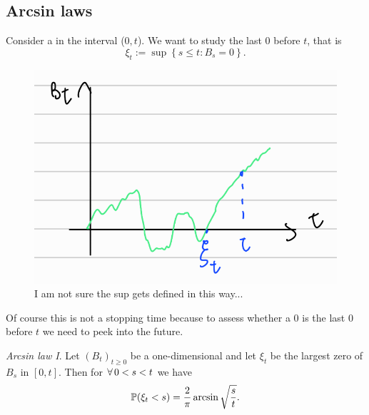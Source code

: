 \documentclass[12pt]{report}
\begin{document}
\subsection{Arcsin laws}
Consider a \bwm{} in the interval ($0,t$). We want to study the last 0 before $t$, that is
\begin{equation*}
	\xi_{t}:=\sup\left\{s\leq t:B_{s}=0\right\}.
\end{equation*}
\begin{figure}[h]
	\centering
	\includegraphics[width=0.5\linewidth]{img/screenshot032}
	\caption{I am not sure the sup gets defined in this way...}
	\label{fig:screenshot032}
\end{figure}
Of course this is not a stopping time because to assess whether a 0 is the last 0 before $t$ we need to peek into the future.
\begin{theorem}
\emph{Arcsin law I}.	Let ${(B_{t})}_{t\geq0}$ be a one-dimensional \bwm{} and let $\xi_{t}$ be the largest zero of $B_{s}$ in $[0,t]$. Then for $\forall\, 0<s<t$ we have
	\begin{equation*}
		\mathbb{P}(\xi_{t}<s)=\frac{2}{\pi}\arcsin\sqrt{\frac{s}{t}}.
	\end{equation*}
\end{theorem}
\end{document}
